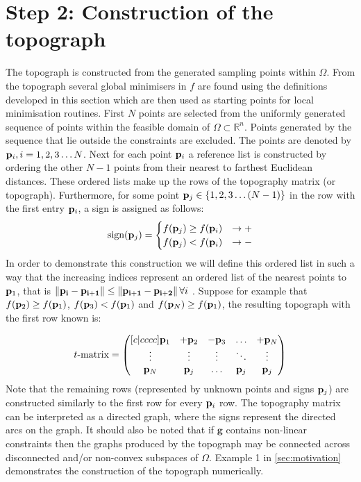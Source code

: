 \section{Step 2:  Construction of the topograph} \label{sec:tgo2}
The topograph is constructed from the generated sampling points within $\Omega$. From the topograph several global minimisers in $f$ are found using the definitions developed in this section which are then used as starting points for local minimisation routines. First $N$ points are selected from the uniformly generated sequence of points within the feasible domain of $\Omega \subset \mathbb{R}^n$. Points generated by the sequence that lie outside the constraints are excluded. The points are denoted by $\bold{p}_i, i = 1, 2, 3 \dots N$. Next for each point $\bold{p}_i $ a reference list is constructed by ordering the other $N -1$ points from their nearest to farthest Euclidean distances. These ordered lists make up the rows of the topography matrix (or topograph). Furthermore, for some point $\bold{p}_j \in \left\{1, 2, 3 \dots (N - 1)\right\}$ in the row with the first entry $\bold{p}_i $, a sign is assigned as follows:
\[ \textrm{sign} (\bold{p}_j) = \begin{cases} 
       f(\bold{p}_j)  \geq f(\bold{p}_i) & \rightarrow +\\
       f(\bold{p}_j) <  f(\bold{p}_i)  & \rightarrow  -
   \end{cases}
\]
In order to demonstrate this construction we will define this ordered list in such a way that the increasing indices represent an ordered list of the nearest points to $\bold{p}_1$, that is $\left\| \mathbf{\bold{p}_{i }} - \mathbf{\bold{p}_{i + 1}} \right\|  \leq \left\| \mathbf{\bold{p}_{i+1 }} - \mathbf{\bold{p}_{i + 2}} \right\|   \forall i$ .  Suppose for example that $f(\bold{p}_2)  \geq f(\bold{p}_1) $,  $f(\bold{p}_3 )< f(\bold{p}_1)$ and $f(\bold{p}_N ) \geq f(\bold{p}_1)$, the resulting topograph with the first row known is:

\begin{equation} \label{eq:tmatrix}
t \textrm{-} \textrm{matrix} =
    \begin{pmatrix} [c|cccc]
  \bold{p}_1 & +\bold{p}_2 		& -\bold{p}_3				& \dots 		&  +\bold{p}_N\\
   \vdots &    \vdots 	&     \vdots 	& \ddots 	&  \vdots\\
   \bold{p}_N & \bold{p}_j 			&  \dots			&  \bold{p}_j 		&  \bold{p}_j \\ 
    \end{pmatrix}
\end{equation}
Note that the remaining rows (represented by unknown points and signs $\bold{p}_j$) are constructed similarly to the first row for every $\bold{p}_i$ row. The topography matrix can be interpreted as a directed graph, where the signs represent the directed arcs on the graph. It should also be noted that if $\mathbf{g}$ contains non-linear constraints then the graphs produced by the topograph may be connected across disconnected and/or non-convex subspaces of $\Omega$.  Example 1 in \autoref{sec:motivation} demonstrates the construction of the topograph numerically.

